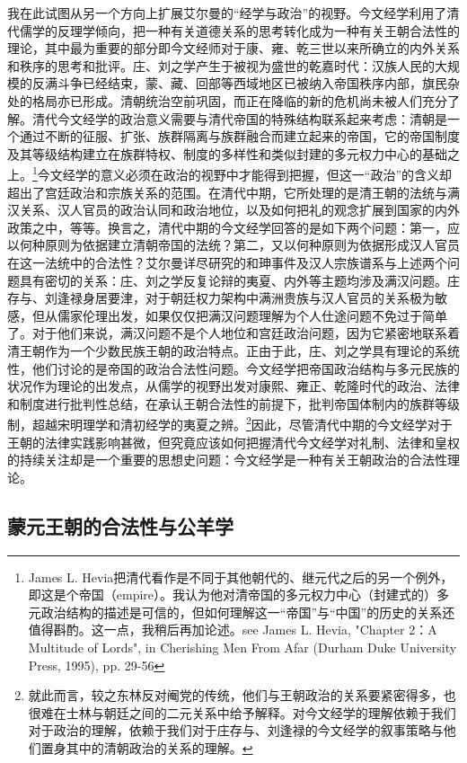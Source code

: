\documentclass[a4paper, 12pt, openright]{ctexbook}
\begin{document}
我在此试图从另一个方向上扩展艾尔曼的“经学与政治”的视野。今文经学利用了清代儒学的反理学倾向，把一种有关道德关系的思考转化成为一种有关王朝合法性的理论，其中最为重要的部分即今文经师对于康、雍、乾三世以来所确立的内外关系和秩序的思考和批评。庄、刘之学产生于被视为盛世的乾嘉时代：汉族人民的大规模的反满斗争已经结束，蒙、藏、回部等西域地区已被纳入帝国秩序内部，旗民杂处的格局亦已形成。清朝统治空前巩固，而正在降临的新的危机尚未被人们充分了解。清代今文经学的政治意义需要与清代帝国的特殊结构联系起来考虑：清朝是一个通过不断的征服、扩张、族群隔离与族群融合而建立起来的帝国，它的帝国制度及其等级结构建立在族群特权、制度的多样性和类似封建的多元权力中心的基础之上。\footnote{James L. Hevia把清代看作是不同于其他朝代的、继元代之后的另一个例外，即这是个帝国（empire）。我认为他对清帝国的多元权力中心（封建式的）多元政治结构的描述是可信的，但如何理解这一“帝国”与“中国”的历史的关系还值得斟酌。这一点，我稍后再加论述。see James L. Hevia, "Chapter 2：A Multitude of Lords", in Cherishing Men From Afar (Durham Duke University Press, 1995), pp. 29-56}今文经学的意义必须在政治的视野中才能得到把握，但这一“政治”的含义却超出了宫廷政治和宗族关系的范围。在清代中期，它所处理的是清王朝的法统与满汉关系、汉人官员的政治认同和政治地位，以及如何把礼的观念扩展到国家的内外政策之中，等等。换言之，清代中期的今文经学回答的是如下两个问题：第一，应以何种原则为依据建立清朝帝国的法统？第二，又以何种原则为依据形成汉人官员在这一法统中的合法性？艾尔曼详尽研究的和珅事件及汉人宗族谱系与上述两个问题具有密切的关系：庄、刘之学反复论辩的夷夏、内外等主题均涉及满汉问题。庄存与、刘逢禄身居要津，对于朝廷权力架构中满洲贵族与汉人官员的关系极为敏感，但从儒家伦理出发，如果仅仅把满汉问题理解为个人仕途问题不免过于简单了。对于他们来说，满汉问题不是个人地位和宫廷政治问题，因为它紧密地联系着清王朝作为一个少数民族王朝的政治特点。正由于此，庄、刘之学具有理论的系统性，他们讨论的是帝国的政治合法性问题。今文经学把帝国政治结构与多元民族的状况作为理论的出发点，从儒学的视野出发对康熙、雍正、乾隆时代的政治、法律和制度进行批判性总结，在承认王朝合法性的前提下，批判帝国体制内的族群等级制，超越宋明理学和清初经学的夷夏之辨。\footnote{就此而言，较之东林反对阉党的传统，他们与王朝政治的关系要紧密得多，也很难在士林与朝廷之间的二元关系中给予解释。对今文经学的理解依赖于我们对于政治的理解，依赖于我们对于庄存与、刘逢禄的今文经学的叙事策略与他们置身其中的清朝政治的关系的理解。}因此，尽管清代中期的今文经学对于王朝的法律实践影响甚微，但究竟应该如何把握清代今文经学对礼制、法律和皇权的持续关注却是一个重要的思想史问题：今文经学是一种有关王朝政治的合法性理论。

\subsection{蒙元王朝的合法性与公羊学}
\end{document}
